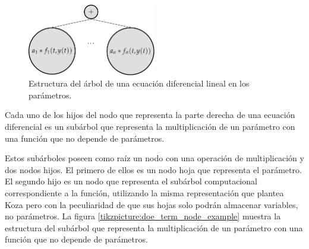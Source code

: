 
\begin{figure}[h]
    \centering
    \includegraphics[width=0.5\textwidth]{"figures/doe_node_example.pdf"}
    \caption{Estructura del árbol de una ecuación diferencial lineal en los parámetros.}
    \label{tikzpicture:doe_node_example}
\end{figure}

Cada uno de los hijos del nodo que representa la parte derecha de una ecuación diferencial es un subárbol que representa la multiplicación de un parámetro con una función que no depende de parámetros.

Estos subárboles poseen como raíz un nodo con una operación de multiplicación y dos nodos hijos. El primero de ellos es un nodo hoja que representa el parámetro. El segundo hijo es un nodo que representa el subárbol computacional correspondiente a la función, utilizando la misma representación que plantea Koza \cite{zelinka2005analytic} pero con la peculiaridad de que sus hojas solo podrán almacenar variables, no parámetros. La figura \ref{tikzpicture:doe_term_node_example} muestra la estructura del subárbol que representa la multiplicación de un parámetro con una función que no depende de parámetros.



